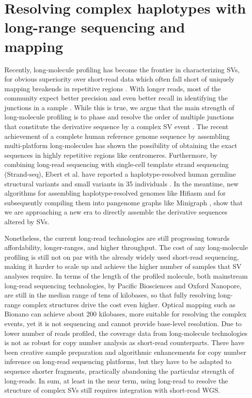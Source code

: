 \documentclass[phd,tocprelim]{cornell}
\begin{document}
\section{Resolving complex haplotypes with long-range sequencing and mapping}

Recently, long-molecule profiling has become the frontier in characterizing SVs, for obvious superiority over short-read data which often fall short of uniquely mapping breakends in repetitive regions \cite{Behr2021-gf}. With longer reads, most of the community expect better precision and even better recall in identifying the junctions in a sample \cite{Zhao2021-bi}. While this is true, we argue that the main strength of long-molecule profiling is to phase and resolve the order of multiple junctions that constitute the derivative sequence by a complex SV event \cite{Behr2021-gf,Hadi2020-um,Luebeck2020-ow,Aganezov2020-cu}. The recent achievement of a complete human reference genome sequence by assembling multi-platform long-molecules \cite{Nurk2021-ro} has shown the possibility of obtaining the exact sequences in highly repetitive regions like centromeres. Furthermore, by combining long-read sequencing with single-cell template strand sequencing (Strand-seq), Ebert et al. have reported a haplotype-resolved human germline structural variants and small variants in 35 individuals \cite{Ebert2021-hl}. In the meantime, new algorithms for assembling haplotype-resolved genomes like Hifiasm \cite{Cheng2021-nh} and for subsequently compiling them into pangenome graphs like Minigraph \cite{Li2020-ai}, show that we are approaching a new era to directly assemble the derivative sequences altered by SVs.

Nonetheless, the current long-read technologies are still progressing towards affordability, longer-ranges, and higher throughput. The cost of any long-molecule profiling is still not on par with the already widely used short-read sequencing, making it harder to scale up and achieve the higher number of samples that SV analyses require. In terms of the length of the profiled molecule, both mainstream long-read sequencing technologies, by Pacific Biosciences and Oxford Nanopore, are still in the median range of tens of kilobases, so that fully resolving long-range complex structures drive the cost even higher. Optical mapping such as Bionano can achieve about 200 kilobases, more suitable for resolving the complex events, yet it is not sequencing and cannot provide base-level resolution. Due to lower number of reads profiled, the coverage data from long-molecule technologies is not as robust for copy number analysis as short-read counterparts. There have been creative sample preparation and algorithmic enhancements \cite{Baslan2020-hz,Prabakar2019-dw} for copy number inference on long-read sequencing platforms, but they have to be adapted to sequence shorter fragments, practically abandoning the particular strength of long-reads. In sum, at least in the near term, using long-read to resolve the structure of complex SVs still requires integration with short-read WGS.
\end{document}
